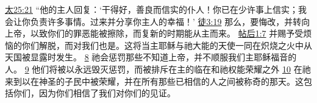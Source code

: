 \documentclass[12pt, a4paper, oneside]{ctexart}
\begin{document}
{		\href{https://biblehub.com/matthew/25-21.htm}{太25:21} “他的主人回复：‘干得好，善良而信实的仆人！你已在少许事上信实；我会让你负责许多事情。过来并分享你主人的幸福！’
		\href{https://biblehub.com/acts/3-19.htm}{徒3:19} 那么，要悔改，并转向上帝，以致你们的罪恶能被擦除，而复新的时期能从主而来。
		\href{https://biblehub.com/2_thessalonians/1-7.htm}{帖后1:7} 并赐予受烦恼的你们解脱，而对我们也是。这将当主耶稣与祂大能的天使一同在炽烧之火中从天国被显露时发生。
		\href{https://biblehub.com/2_thessalonians/1-8.htm}{8} 祂会惩罚那些不知道上帝，并不顺服我们主耶稣福音的人。
		\href{https://biblehub.com/2_thessalonians/1-9.htm}{9} 他们将被以永远毁灭惩罚，而被排斥在主的临在和祂权能荣耀之外
		\href{https://biblehub.com/2_thessalonians/1-10.htm}{10} 在祂来到以在神圣的子民中被荣耀，并在所有那些已相信的人之间被称奇的那天。这包括你们，因为你们相信了我们对你们的见证。
	}
\end{document}
